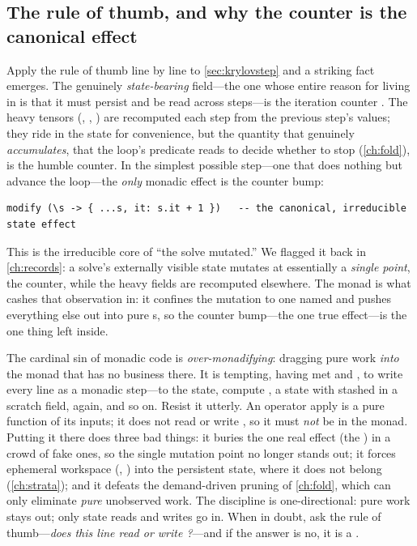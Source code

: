 \subsection{The rule of thumb, and why the counter is the canonical effect}
\label{sec:counter}

Apply the rule of thumb line by line to \cref{sec:krylovstep} and a striking fact
emerges. The genuinely \emph{state-bearing} field---the one whose entire reason for
living in  is that it must persist and be read across steps---is the
iteration counter . The heavy tensors (, , ) are
recomputed each step from the previous step's values; they ride in the state for
convenience, but the quantity that genuinely \emph{accumulates}, that the loop's
predicate reads to decide whether to stop (\cref{ch:fold}), is the humble counter.
In the simplest possible step---one that does nothing but advance the loop---the
\emph{only} monadic effect is the counter bump:

\begin{lstlisting}[style=l4style]
modify (\s -> { ...s, it: s.it + 1 })   -- the canonical, irreducible state effect
\end{lstlisting}

\noindent This is the irreducible core of ``the solve mutated.'' We flagged it back
in \cref{ch:records}: a solve's externally visible state mutates at essentially a
\emph{single point}, the counter, while the heavy fields are recomputed elsewhere.
The monad is what cashes that observation in: it confines the mutation to one named
 and pushes everything else out into pure s, so the counter
bump---the one true effect---is the one thing left inside.

\begin{pitfall}
The cardinal sin of monadic code is \emph{over-monadifying}: dragging pure work
\emph{into} the monad that has no business there. It is tempting, having met
 and , to write every line as a monadic step---to  the
state, compute ,  a state with  stashed in
a scratch field,  again, and so on. Resist it utterly. An operator apply is
a pure function of its inputs; it does not read or write , so it must
\emph{not} be in the monad. Putting it there does three bad things: it buries the one
real effect (the ) in a crowd of fake ones, so the single mutation point
no longer stands out; it forces ephemeral workspace (, ) into the
persistent state, where it does not belong (\cref{ch:strata}); and it defeats the
demand-driven pruning of \cref{ch:fold}, which can only eliminate \emph{pure}
unobserved work. The discipline is one-directional: pure work stays out; only
state reads and writes go in. When in doubt, ask the rule of thumb---\emph{does this
line read or write ?}---and if the answer is no, it is a .
\end{pitfall}

